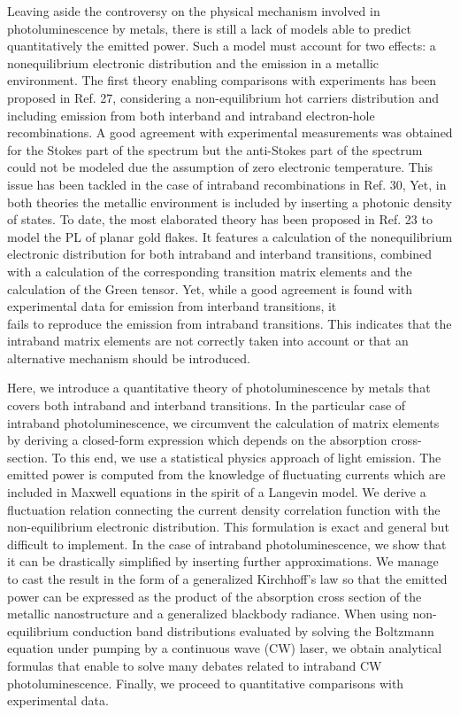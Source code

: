 \documentclass[10pt]{article}
\begin{document}
Leaving aside the controversy on the physical mechanism involved in photoluminescence by metals, there is still a lack of models able to predict quantitatively the emitted power. Such a model must account for two effects: a nonequilibrium electronic distribution and the emission in a metallic environment. The first theory enabling comparisons with experiments has been proposed in Ref. 27, considering a non-equilibrium hot carriers distribution and including emission from both interband and intraband electron-hole recombinations. A good agreement with experimental measurements was obtained for the Stokes part of the spectrum but the anti-Stokes part of the spectrum could not be modeled due the assumption of zero electronic temperature. This issue has been tackled in the case of intraband recombinations in Ref. 30, Yet, in both theories the metallic environment is included by inserting a photonic density of states. To date, the most elaborated theory has been proposed in Ref. 23 to model the PL of planar gold flakes. It features a calculation of the nonequilibrium electronic distribution for both intraband and interband transitions, combined with a calculation of the corresponding transition matrix elements and the calculation of the Green tensor. Yet, while a good agreement is found with experimental data for emission from interband transitions, it\\
fails to reproduce the emission from intraband transitions. This indicates that the intraband matrix elements are not correctly taken into account or that an alternative mechanism should be introduced.

Here, we introduce a quantitative theory of photoluminescence by metals that covers both intraband and interband transitions. In the particular case of intraband photoluminescence, we circumvent the calculation of matrix elements by deriving a closed-form expression which depends on the absorption cross-section. To this end, we use a statistical physics approach of light emission. The emitted power is computed from the knowledge of fluctuating currents which are included in Maxwell equations in the spirit of a Langevin model. We derive a fluctuation relation connecting the current density correlation function with the non-equilibrium electronic distribution. This formulation is exact and general but difficult to implement. In the case of intraband photoluminescence, we show that it can be drastically simplified by inserting further approximations. We manage to cast the result in the form of a generalized Kirchhoff's law so that the emitted power can be expressed as the product of the absorption cross section of the metallic nanostructure and a generalized blackbody radiance. When using non-equilibrium conduction band distributions evaluated by solving the Boltzmann equation under pumping by a continuous wave (CW) laser, we obtain analytical formulas that enable to solve many debates related to intraband CW photoluminescence. Finally, we proceed to quantitative comparisons with experimental data.
\end{document}

